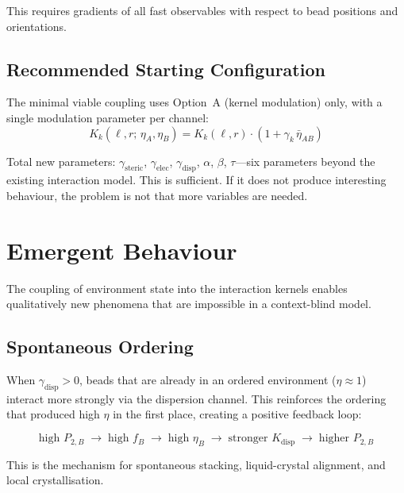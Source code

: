 \documentclass[11pt]{article}
\begin{document}
This requires gradients of all fast observables with respect to bead
positions and orientations.

\subsection{Recommended Starting Configuration}

The minimal viable coupling uses Option~A (kernel modulation) only, with a
single modulation parameter per channel:
\begin{equation}
    K_k(\ell, r;\, \eta_A, \eta_B)
    = K_k(\ell, r) \cdot \left(1 + \gamma_k\, \bar{\eta}_{AB}\right)
\end{equation}

Total new parameters: $\gamma_{\mathrm{steric}}$,
$\gamma_{\mathrm{elec}}$, $\gamma_{\mathrm{disp}}$, $\alpha$, $\beta$,
$\tau$---six parameters beyond the existing interaction model.  This is
sufficient.  If it does not produce interesting behaviour, the problem is
not that more variables are needed.

\section{Emergent Behaviour}

The coupling of environment state into the interaction kernels enables
qualitatively new phenomena that are impossible in a context-blind model.

\subsection{Spontaneous Ordering}

When $\gamma_{\mathrm{disp}} > 0$, beads that are already in an ordered
environment ($\eta \approx 1$) interact more strongly via the dispersion
channel.  This reinforces the ordering that produced high $\eta$ in the
first place, creating a positive feedback loop:

\begin{equation}
    \text{high } P_{2,B} \;\to\;
    \text{high } f_B \;\to\;
    \text{high } \eta_B \;\to\;
    \text{stronger } K_{\mathrm{disp}} \;\to\;
    \text{higher } P_{2,B}
\end{equation}

This is the mechanism for spontaneous stacking, liquid-crystal alignment,
and local crystallisation.
\end{document}
